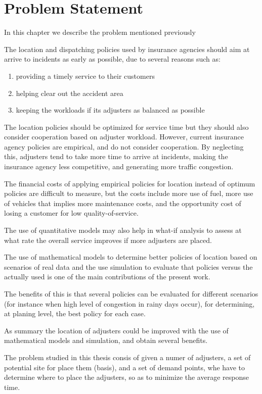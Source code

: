 \section{Problem Statement}
In this chapter we describe the problem
mentioned previously

The location and dispatching policies
used by insurance agencies
should aim
at arrive to incidents
as early as possible,
due to several reasons
such as:
\begin{enumerate}
\item providing a timely service to their customers
\item helping clear out the accident area
\item keeping the workloads if its adjusters
  as balanced as possible
\end{enumerate}
The location policies
should be optimized for service time
but they should also consider
cooperation based on adjuster workload.
However,
current insurance agency policies
are empirical,
and do not consider cooperation.
By neglecting this,
adjusters tend to take
more time to arrive at incidents,
making the insurance agency
less competitive,
and generating more traffic congestion.

The financial costs
of applying
empirical policies for location
instead of optimum policies
are difficult to measure,
but the costs include
more use of fuel,
more use of vehicles
that implies
more maintenance costs,
and the opportunity cost
of losing a customer
for low quality-of-service.

The use of quantitative models
may also help
in what-if analysis
to assess at what rate
the overall service
improves if more adjusters are placed.

The use of mathematical models
to determine better policies of location
based on scenarios
of real data
and the use simulation
to evaluate that policies
versus the actually used
is one of the main contributions
of the present work.

The benefits of this
is that several policies
can be evaluated
for different scenarios
(for instance
when high level of congestion
in rainy days occur),
for determining,
at planing level,
the best policy
for each case.

As summary
the location of adjusters
could be improved
with the use of
mathematical models and simulation,
and obtain several benefits.

The problem studied in this thesis
consis of
given a numer of adjusters,
a set of potential site for place them (basis),
and a set of demand points,
whe have to determine
where to place the adjusters,
so as to minimize 
the average response time.
